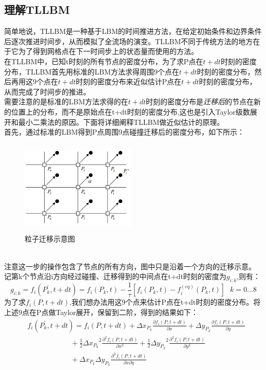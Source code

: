 \documentclass[UTF8]{ctexart}
\begin{document}
\subsection{理解TLLBM}
简单地说，TLLBM是一种基于LBM的时间推进方法，在给定初始条件和边界条件后逐次推进时间步，从而模拟了全流场的演变。TLLBM不同于传统方法的地方在于它为了得到网格点在下一时间步上的状态量而使用的方法。\\
\indent 在TLLBM中，已知t时刻的所有节点的密度分布，为了求P点在$t+dt$时刻的密度分布，TLLBM首先用标准的LBM方法求得周围9个点在$t+dt$时刻的密度分布，然后再用这9个点在$t+dt$时刻的密度分布来近似估计P点在$t+dt$时刻的密度分布，从而完成了时间步的推进。\\
\indent 需要注意的是标准的LBM方法求得的在$t+dt$时刻的密度分布是\emph{迁移后}的节点在新的位置上的分布，而不是原始点在t+dt时刻的密度分布,这也是引入Taylor级数展开和最小二乘法的原因。下面将详细阐释TLLBM做近似估计的原理。\\
\indent 首先，通过标准的LBM得到P点周围9点碰撞迁移后的密度分布，如下所示：
\begin{figure}[htbp]
\centering\includegraphics[width=5.5cm,height=4.5cm]{../pic/9pts.png}
\caption{粒子迁移示意图}
\end{figure}\\
\indent 注意这一步的操作包含了节点的所有方向，图中只是沿着一个方向的迁移示意。\\
\indent 记第k个节点沿i方向经过碰撞、迁移得到的中间点在t+dt时刻的密度为$g_{i:k}$,则有：
\begin{equation} 
g_{i:k}= f_i(P_k^\prime,t+dt)=f_i(P_k,t)-\frac{1}{\tau}[f_i(P_k,t)-f_i^{(eq)}(P_k,t)] \ \ \  k=0...8
\end{equation}
\indent 为了求$f_i(P,t+dt)$,我们想办法用这9个点来估计P点在t+dt时刻的密度分布。将上述9点在P点做Taylor展开，保留到二阶，得到的结果如下：
\begin{equation}
\begin{split}
&f_i(P_k^\prime,t+dt)=f_i(P,t+dt)+\Delta x_{P_k} \frac{\partial f_i(P,t+dt)}{\partial x} +\Delta y_{P_k} \frac{\partial f_i(P,t+dt)}{\partial y}\\
&\qquad \qquad \qquad + \frac{1}{2} {\Delta x_{P_k}}^2 \frac{\partial^{2} f_i(P,t+dt)}{\partial x^{2}}+\frac{1}{2} {\Delta y_{P_k}}^2 \frac{\partial^{2} f_i(P,t+dt)}{\partial y^{2}} \\
&\qquad \qquad \qquad + \Delta x_{P_k} \Delta y_{P_k} \frac{\partial^{2} f_i(P,t+dt)}{{\partial x} {\partial y}}
\end{split}
\end{equation}
\end{document}
